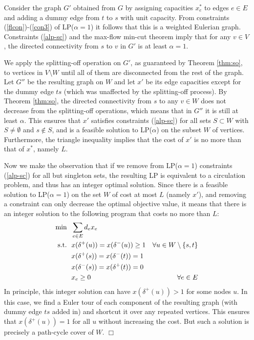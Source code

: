 \documentclass[11pt]{article}
\newcommand{\qed}{\hspace*{\fill}$\Box$}
\newenvironment{proof}[1][Proof. ]{\noindent {\bf #1 }}{\qed}
\begin{document}
\begin{proof}
Consider the graph $G'$ obtained from $G$ by assigning capacities $x^*_e$ to edges $e\in E$ and adding a dummy edge from $t$ to $s$ with unit capacity. From constraints (\ref{flcon})-(\ref{con3}) of LP($\alpha=1$) it follows that this is a weighted Eulerian graph. Constraints (\ref{alp-sc}) and the max-flow min-cut theorem imply that for any $v\in V$, the directed connectivity from $s$ to $v$ in $G'$ is at least $\alpha=1$.

We apply the splitting-off operation on $G'$, as guaranteed by Theorem \ref{thm:so}, to vertices in $V\setminus W$ until all of them are disconnected from the rest of the graph. Let $G''$ be the resulting graph on $W$ and let $x'$ be its edge capacities except for the dummy edge $ts$ (which was unaffected by the splitting-off process).
By Theorem \ref{thm:so}, the directed connectivity from $s$ to any $v\in W$ does not decrease from the splitting-off operations, which means that in $G''$ it is still at least $\alpha$. This ensures that $x'$ satisfies constraints (\ref{alp-sc}) for all sets $S\subset W$ with $S\neq \emptyset$ and 
$s\notin S$, and is a feasible solution to LP($\alpha$) on the subset $W$ of vertices. Furthermore, the triangle inequality implies that the cost of $x'$ is no more than that of $x^*$, namely $L$.

Now we make the observation that if we remove from LP($\alpha=1$) constraints (\ref{alp-sc}) for all but singleton sets, the resulting LP is equivalent to a circulation problem, and thus has an integer 
optimal solution. Since there is a feasible solution to LP($\alpha=1$) on the set $W$ of cost at most $L$ (namely $x'$), and removing a 
constraint can only decrease the optimal objective value, it means that there is an integer solution to the following program that costs no more than $L$:
\begin{align}
\mbox{min}~~ & \sum_{e\in E} d_e x_e \label{intlp} \\
\mbox{s.t.}~~ & x(\delta^+(u))=x(\delta^-(u)) \geq 1 & \forall u\in W \setminus \{s,t\} \notag \\
& x(\delta^+(s))=x(\delta^-(t))=1 \label{amtfl} \\
& x(\delta^-(s))=x(\delta^+(t))=0  \notag \\
& x_e \geq 0 & \forall e\in E  \notag 
\end{align}
In principle, this integer solution can have $x(\delta^+(u))>1$ 
for some nodes $u$. In this case, we find a Euler tour of each component of the resulting graph (with dummy edge $ts$ added in) and shortcut it over any repeated vertices. This ensures that $x(\delta^+(u))=1$ for all $u$ without increasing the cost. 
But such a solution is precisely a path-cycle cover of $W$.
\end{proof}
\end{document}
